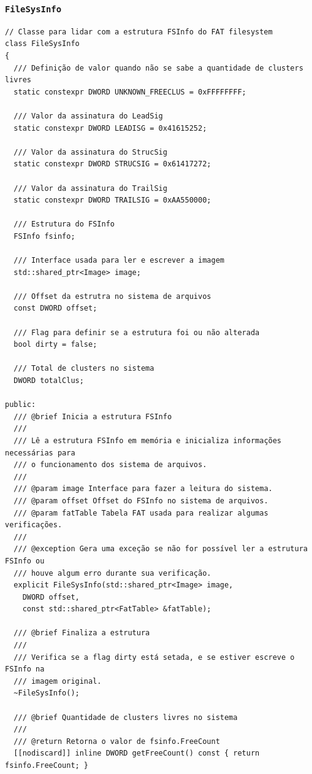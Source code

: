 \documentclass[
    12pt,				%
    oneside,   	        %
    a4paper,			%
    english,			%
    french,				%
    spanish,			%
    brazil,				%
    ]{pacotes/abntex2}
\begin{document}
\subsubsection{\texttt{FileSysInfo}}
\label{subsubsec:file_sys_info}

\begin{lstlisting}[caption={Classe que abstrai a extração de informações da estrutura FSInfo}, label={lst:fileinfo}]
// Classe para lidar com a estrutura FSInfo do FAT filesystem
class FileSysInfo
{
  /// Definição de valor quando não se sabe a quantidade de clusters livres
  static constexpr DWORD UNKNOWN_FREECLUS = 0xFFFFFFFF;

  /// Valor da assinatura do LeadSig
  static constexpr DWORD LEADISG = 0x41615252;

  /// Valor da assinatura do StrucSig
  static constexpr DWORD STRUCSIG = 0x61417272;

  /// Valor da assinatura do TrailSig
  static constexpr DWORD TRAILSIG = 0xAA550000;

  /// Estrutura do FSInfo
  FSInfo fsinfo;

  /// Interface usada para ler e escrever a imagem
  std::shared_ptr<Image> image;

  /// Offset da estrutra no sistema de arquivos
  const DWORD offset;

  /// Flag para definir se a estrutura foi ou não alterada
  bool dirty = false;

  /// Total de clusters no sistema
  DWORD totalClus;

public:
  /// @brief Inicia a estrutura FSInfo
  ///
  /// Lê a estrutura FSInfo em memória e inicializa informações necessárias para
  /// o funcionamento dos sistema de arquivos.
  ///
  /// @param image Interface para fazer a leitura do sistema.
  /// @param offset Offset do FSInfo no sistema de arquivos.
  /// @param fatTable Tabela FAT usada para realizar algumas verificações.
  ///
  /// @exception Gera uma exceção se não for possível ler a estrutura FSInfo ou
  /// houve algum erro durante sua verificação.
  explicit FileSysInfo(std::shared_ptr<Image> image,
    DWORD offset,
    const std::shared_ptr<FatTable> &fatTable);

  /// @brief Finaliza a estrutura
  ///
  /// Verifica se a flag dirty está setada, e se estiver escreve o FSInfo na
  /// imagem original.
  ~FileSysInfo();

  /// @brief Quantidade de clusters livres no sistema
  ///
  /// @return Retorna o valor de fsinfo.FreeCount
  [[nodiscard]] inline DWORD getFreeCount() const { return fsinfo.FreeCount; }


\end{lstlisting}
\end{document}
